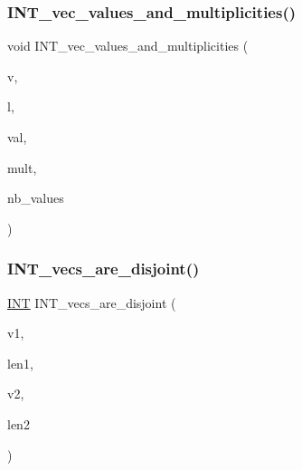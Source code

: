 \mbox{\label{sorting_8_c_a289e8cd180b6a76004552b27c27a679b}} 
\subsubsection{\texorpdfstring{I\+N\+T\+\_\+vec\+\_\+values\+\_\+and\+\_\+multiplicities()}{INT\_vec\_values\_and\_multiplicities()}}
{\footnotesize\ttfamily void I\+N\+T\+\_\+vec\+\_\+values\+\_\+and\+\_\+multiplicities (\begin{DoxyParamCaption}\item[{\mbox{\hyperlink{galois_8h_a09fddde158a3a20bd2dcadb609de11dc}{I\+NT}} $\ast$}]{v,  }\item[{\mbox{\hyperlink{galois_8h_a09fddde158a3a20bd2dcadb609de11dc}{I\+NT}}}]{l,  }\item[{\mbox{\hyperlink{galois_8h_a09fddde158a3a20bd2dcadb609de11dc}{I\+NT}} $\ast$\&}]{val,  }\item[{\mbox{\hyperlink{galois_8h_a09fddde158a3a20bd2dcadb609de11dc}{I\+NT}} $\ast$\&}]{mult,  }\item[{\mbox{\hyperlink{galois_8h_a09fddde158a3a20bd2dcadb609de11dc}{I\+NT}} \&}]{nb\+\_\+values }\end{DoxyParamCaption})}

\mbox{\label{sorting_8_c_aebfccd20eba01d94abd76321ff5b038a}} 
\subsubsection{\texorpdfstring{I\+N\+T\+\_\+vecs\+\_\+are\+\_\+disjoint()}{INT\_vecs\_are\_disjoint()}}
{\footnotesize\ttfamily \mbox{\hyperlink{galois_8h_a09fddde158a3a20bd2dcadb609de11dc}{I\+NT}} I\+N\+T\+\_\+vecs\+\_\+are\+\_\+disjoint (\begin{DoxyParamCaption}\item[{\mbox{\hyperlink{galois_8h_a09fddde158a3a20bd2dcadb609de11dc}{I\+NT}} $\ast$}]{v1,  }\item[{\mbox{\hyperlink{galois_8h_a09fddde158a3a20bd2dcadb609de11dc}{I\+NT}}}]{len1,  }\item[{\mbox{\hyperlink{galois_8h_a09fddde158a3a20bd2dcadb609de11dc}{I\+NT}} $\ast$}]{v2,  }\item[{\mbox{\hyperlink{galois_8h_a09fddde158a3a20bd2dcadb609de11dc}{I\+NT}}}]{len2 }\end{DoxyParamCaption})}

